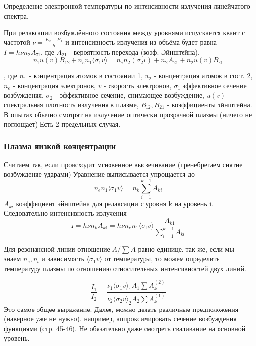 \documentclass[10pt, a4paper]{article}
\begin{document}
Определение электронной температуры по интенсивности излучения линейчатого спектра.

При релаксации возбуждённого состояния между уровнями испускается квант с частотой $\nu=\frac{E_2-E_1}{h}$ и интенсивность излучения из объёма будет равна $I=h\nu n_{2} A_{21}$, где $A_{21}$ - вероятность перехода (коэф. Эйнштейна).
\begin{equation}
	n_1 u(v)B_{12}+n_e n_1 \langle\sigma_1 v\rangle=n_e n_2 (\sigma_2 v) + n_2 A_{21}+n_2 u(v) B_{21}
\end{equation}

, где $n_1$ - концентрация атомов в состоянии 1, $n_2$ - концентрация атомов в сост. 2, $n_e$ - концентрация электронов, $v$ - скорость электронов, $\sigma_1$ эффективное сечение возбуждения, $\sigma_2$ - эффективное сечение, снимающее возбуждение, $u(v)$ спектральная плотность излучения в плазме, $B_{12}, B_{21}$ - коэффициенты эйнштейна. В опытах обычно смотрят на излучение оптически прозрачной плазмы (ничего не поглощает) Есть 2 предельных случая.

\subsubsection{Плазма низкой концентрации}

Считаем так, если происходит мгновенное высвечивание (пренебрегаем снятие возбуждение ударами)
Уравнение выписывается упрощается до 
\begin{equation}
	n_e n_1 \langle\sigma_1 v\rangle= n_k  \sum\limits_{i=1}^{k-1}A_{k i}
\end{equation}
$A_{k i}$ коэффициент эйнштейна для релаксации с уровня k на уровень i.
Следовательно интенсивность излучения 
\begin{equation}
	I=h \nu n_k A_{k1}=h \nu n_e n_1 \langle\sigma_1 v\rangle\frac{A_{k1}}{\sum\limits_{i=1}^{k-1} A_{ki}}
\end{equation}

Для резонансной линии отношение $A/\sum A $ равно единице. так же, если мы знаем $n_e, n_i$ и зависимость $\langle\sigma_1 v\rangle$ от температуры, то можем определить температуру плазмы по отношению относительных интенсивностей двух линий.

\begin{equation}
	\frac{I_1}{I_2}= \frac {\nu_1 \langle\sigma_1 v\rangle_1 A_1 \sum A_k^{(2)} }{\nu_2 \langle\sigma_2 v\rangle_2 A_2 \sum A_k^{(1)} }
\end{equation}
Это самое общее выражение. Далее, можно делать различные предположения (наверное уже не нужно). например, аппроксимировать сечение возбуждения функциями (стр. 45-46).
Не обязательно даже смотреть сваливание на основной уровень.
\end{document}
